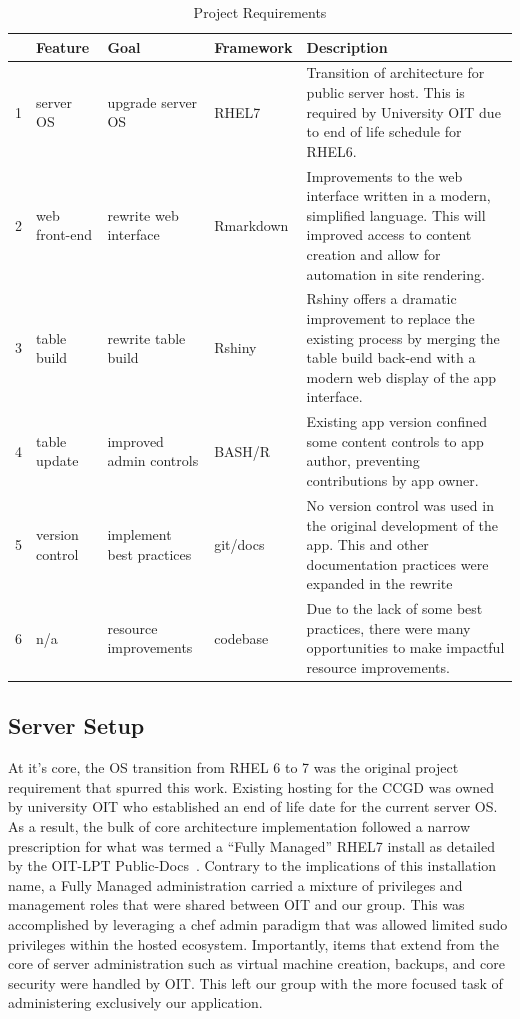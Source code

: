 \documentclass[10pt]{report}
\begin{document}
\begin{table}[H]
    \caption{Project Requirements}\label{table:projectReqs}
    \addtolength\tabcolsep{-0.2em}
    \begin{tabular}{llllp{7cm}}
        \toprule
        &Feature&Goal&Framework&Description\\
        \midrule
        1&server OS&upgrade server OS&RHEL7&Transition of architecture for public server host. This is required by University OIT due to end of life schedule for RHEL6.\\
        \midrule
        2&web front-end&rewrite web interface&Rmarkdown&Improvements to the web interface written in a modern, simplified language. This will improved access to content creation and allow for automation in site rendering.\\
        \midrule
        3&table build&rewrite table build&Rshiny&Rshiny offers a dramatic improvement to replace the existing process by merging the table build back-end with a modern web display of the app interface.\\
        \midrule
        4&table update&improved admin controls&BASH/R&Existing app version confined some content controls to app author, preventing contributions by app owner.\\
        \midrule
        5&version control&implement best practices&git/docs&No version control was used in the original development of the app. This and other documentation practices were expanded in the rewrite\\
        \midrule
        6&n/a&resource improvements&codebase&Due to the lack of some best practices, there were many opportunities to make impactful resource improvements.\\
        \bottomrule
    \end{tabular}
    \addtolength\tabcolsep{+0.2em}
\end{table}

\subsection{Server Setup}
At it's core, the OS transition from RHEL 6 to 7 was the original project requirement that spurred this work. Existing hosting for the CCGD was owned by university OIT who established an end of life date for the current server OS\@. As a result, the bulk of core architecture implementation followed a narrow prescription for what was termed a ``Fully Managed'' RHEL7 install as detailed by the OIT-LPT Public-Docs~\cite{oitOITLPTPublicDocsThis}. Contrary to the implications of this installation name, a Fully Managed administration carried a mixture of privileges and management roles that were shared between OIT and our group. This was accomplished by leveraging a chef admin paradigm that was allowed limited sudo privileges within the hosted ecosystem. Importantly, items that extend from the core of server administration such as virtual machine creation, backups, and core security were handled by OIT\@. This left our group with the more focused task of administering exclusively our application.
\end{document}
